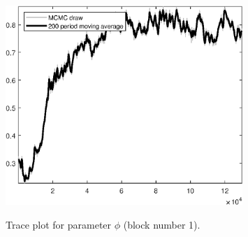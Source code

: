 \begin{figure}[H]
\centering
  \includegraphics[width=0.8\textwidth]{BRS_sectoral_wo_fixed_cost/graphs/TracePlot_phi_blck_1}\\
    \caption{Trace plot for parameter ${\phi}$ (block number 1).}
\end{figure}
